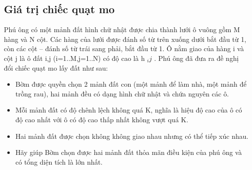 \subsection{   Giá trị chiếc quạt mo  }

   Phú ông có một mảnh đất hình chữ nhật được chia thành lưới ô vuông gồm M hàng và N cột. Các hàng của lưới được đánh số từ trên xuống dưới bắt đầu từ 1, còn các cột – đánh số từ trái sang phải, bắt đầu từ 1. Ô nằm giao của hàng i và cột j là ô đất i,j (i=1..M,j=1..N) có độ cao là h   $_    ij   $   . Phú ông đã đưa ra đề nghị đổi chiếc quạt mo lấy đất như sau:  
\begin{itemize}
	\item     Bờm được quyền chọn 2 mảnh đất con (một mảnh để làm nhà, một mảnh để trồng rau), hai mảnh đều có dạng hình chữ nhật và chứa nguyên các ô.   
	\item     Mỗi mảnh đất có độ chênh lệch không quá K, nghĩa là hiệu độ cao của ô có độ cao nhất với ô có độ cao thấp nhất không vượt quá K.   
	\item     Hai mảnh đất được chọn không không giao nhau nhưng có thể tiếp xúc nhau.   
	\item     Hãy giúp Bờm chọn được hai mảnh đất thỏa mãn điều kiện của phú ông và có tổng diện tích là lớn nhất.   
\end{itemize}

\
